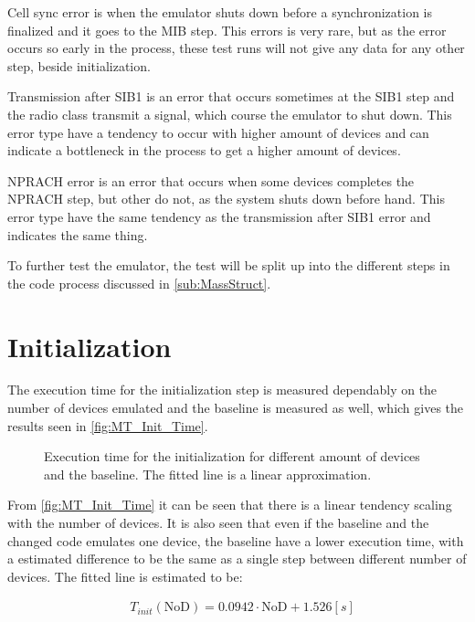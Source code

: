Cell sync error is when the emulator shuts down before a synchronization is finalized and it goes to the MIB step. This errors is very rare, but as the error occurs so early in the process, these test runs will not give any data for any other step, beside initialization.

Transmission after SIB1 is an error that occurs sometimes at the SIB1 step and the radio class transmit a signal, which course the emulator to shut down. This error type have a tendency to occur with higher amount of devices and can indicate a bottleneck in the process to get a higher amount of devices.

NPRACH error is an error that occurs when some devices completes the NPRACH step, but other do not, as the system shuts down before hand. This error type have the same tendency as the transmission after SIB1 error and indicates the same thing.

To further test the emulator, the test will be split up into the different steps in the code process discussed in \autoref{sub:MassStruct}.

\section{Initialization}
The execution time for the initialization step is measured dependably on the number of devices emulated and the baseline is measured as well, which gives the results seen in \autoref{fig:MT_Init_Time}.

\begin{figure}[H]
\centering
\resizebox{0.5\textwidth}{!}{
}
\caption{Execution time for the initialization for different amount of devices and the baseline. The fitted line is a linear approximation.}
\label{fig:MT_Init_Time}
\end{figure}

From \autoref{fig:MT_Init_Time} it can be seen that there is a linear tendency scaling with the number of devices. It is also seen that even if the baseline and the changed code emulates one device, the baseline have a lower execution time, with a estimated difference to be the same as a single step between different number of devices. The fitted line is estimated to be:

\begin{align}
&T_{init} (\text{NoD}) = 0.0942 \cdot \text{NoD} + 1.526 [s]
\end{align}

